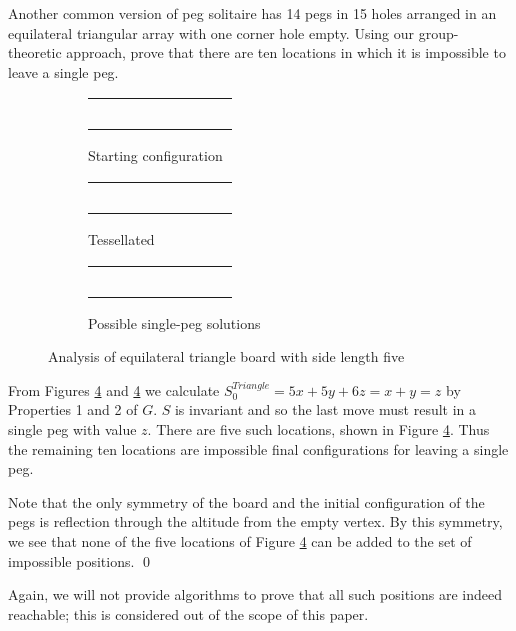 \documentclass[11pt]{article}
\renewenvironment{proof}{{\noindent\bfseries Proof.}}{\qed}
\newenvironment{problem}[2][Problem]{\begin{trivlist}
\item[\hskip \labelsep {\bfseries #1}\hskip \labelsep {\bfseries #2.}]}{\end{trivlist}}
\newcommand*\cir[1]{
  \begin{tikzpicture}[baseline]
    \node[draw,circle,inner sep=0pt,minimum size=12pt,anchor=center](C){#1};
  \end{tikzpicture}}
\newcommand*\h{\cir{}}
\newcommand*\p{
  \begin{tikzpicture}[baseline]
    \node[draw,circle,inner sep=0pt,minimum size=12pt,anchor=center](C){};
    \node[fill=black,circle,inner sep=0pt,minimum size=5pt,anchor=center](C){};
  \end{tikzpicture}}
\newcommand*\x{\cir{$x$}}
\newcommand*\y{\cir{$y$}}
\newcommand*\z{\cir{$z$}}
\newcommand*\trianglefivestart{
\begin{tabular}{m{0pt} m{0pt} m{0pt} m{0pt} m{0pt} m{0pt} m{0pt} m{0pt} m{0pt}}
   &    &    &    & \p &    &    &    &    \\
   &    &    & \p &    & \p &    &    &    \\
   &    & \p &    & \p &    & \p &    &    \\
   & \p &    & \p &    & \p &    & \p &    \\
\p &    & \p &    & \p &    & \p &    & \h \\
\end{tabular}}
\newcommand*\trianglefivetessellated{
\begin{tabular}{m{0pt} m{0pt} m{0pt} m{0pt} m{0pt} m{0pt} m{0pt} m{0pt} m{0pt}}
   &    &    &    & \x &    &    &    &    \\
   &    &    & \y &    & \z &    &    &    \\
   &    & \z &    & \x &    & \y &    &    \\
   & \x &    & \y &    & \z &    & \x &    \\
\y &    & \z &    & \x &    & \y &    & \z \\
\end{tabular}}
\begin{document}
\begin{problem}{2}
Another common version of peg solitaire has 14 pegs in 15 holes arranged in an equilateral triangular array with one corner hole empty. Using our group-theoretic approach, prove that there are ten locations in which it is impossible to leave a single peg.

\begin{figure}[h]
\centering
\begin{subfigure}{.3\textwidth}
\centering
\trianglefivestart
\caption{Starting configuration}\label{subfig:triangleanalysis:a}
\end{subfigure}%
\begin{subfigure}{.3\textwidth}
\centering
\trianglefivetessellated
\caption{Tessellated}\label{subfig:triangleanalysis:b}
\end{subfigure}
\begin{subfigure}{.3\textwidth}
\centering
\begin{tabular}{m{0pt} m{0pt} m{0pt} m{0pt} m{0pt} m{0pt} m{0pt} m{0pt} m{0pt}}
   &    &    &    & \h &    &    &    &    \\
   &    &    & \h &    & \p &    &    &    \\
   &    & \p &    & \h &    & \h &    &    \\
   & \h &    & \h &    & \p &    & \h &    \\
\h &    & \p &    & \h &    & \h &    & \p \\
\end{tabular}
\caption{Possible single-peg solutions}\label{subfig:triangleanalysis:c}
\end{subfigure}
\caption{Analysis of equilateral triangle board with side length five}
\label{fig:triangleanalysis}
\end{figure}

\begin{proof}
From Figures \ref{fig:triangleanalysis} and \ref{fig:triangleanalysis} we calculate $S^{Triangle}_0 = 5x + 5y + 6z = x + y = z$ by Properties 1 and 2 of $G$. $S$ is invariant and so the last move must result in a single peg with value $z$. There are five such locations, shown in Figure \ref{fig:triangleanalysis}. Thus the remaining ten locations are impossible final configurations for leaving a single peg.

Note that the only symmetry of the board and the initial configuration of the pegs is reflection through the altitude from the empty vertex. By this symmetry, we see that none of the five locations of Figure \ref{fig:triangleanalysis} can be added to the set of impossible positions.
\end{proof}

Again, we will not provide algorithms to prove that all such positions are indeed reachable; this is considered out of the scope of this paper.
\end{problem}
\end{document}
